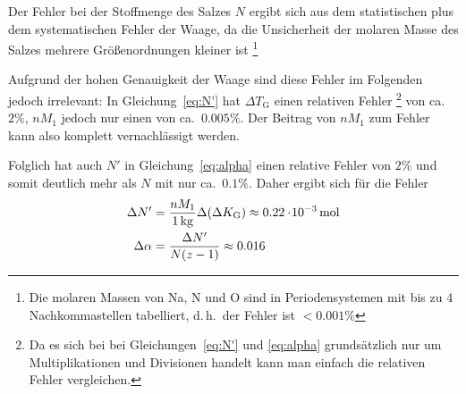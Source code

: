 Der Fehler bei der Stoffmenge des Salzes $N$ ergibt sich aus dem statistischen plus dem systematischen Fehler der Waage, da die Unsicherheit der molaren Masse des Salzes mehrere Größenordnungen kleiner ist%
\footnote{Die molaren Massen von Na, N und O sind in Periodensystemen mit bis zu 4 Nachkommastellen tabelliert, d.\,h.\ der Fehler ist $<0.001\%$}%

Aufgrund der hohen Genauigkeit der Waage sind diese Fehler im Folgenden jedoch irrelevant: 
%
%
In Gleichung~\ref{eq:N'} hat $\Delta T_\mathrm{G}$ einen relativen Fehler%
\footnote{Da es sich bei bei Gleichungen~\ref{eq:N'} und \ref{eq:alpha} grundsätzlich nur um Multiplikationen und Divisionen handelt kann man einfach die relativen Fehler vergleichen.}
von ca.\ $2\%$, $n M_1$ jedoch nur einen von ca.\ $0.005\%$. Der Beitrag von $n M_1$ zum Fehler kann also komplett vernachlässigt werden.

Folglich hat auch $N'$ in Gleichung~\ref{eq:alpha} einen relative Fehler von $2\%$ und somit deutlich mehr als $N$ mit nur ca.\ $0.1\%$. Daher ergibt sich für die Fehler
%
\begin{align*}
        \stat N' &= \frac{n M_1}{\unit[1]{kg}} \stat(\Delta K_\mathrm{G}) \approx \unit[0.22\cdot\! 10^{-3}]{mol} \\
    \stat \alpha &= \frac{\stat N'}{N (z-1)} \approx 0.016
\end{align*}
%






